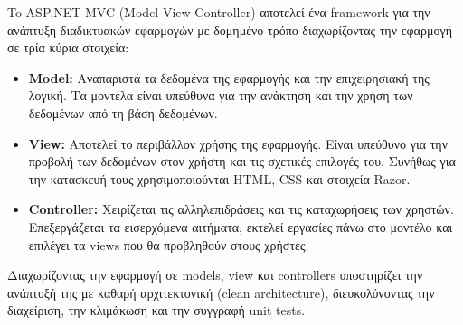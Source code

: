 To ASP.NET MVC (Model-View-Controller) αποτελεί ένα framework για την ανάπτυξη διαδικτυακών εφαρμογών
με δομημένο τρόπο διαχωρίζοντας την εφαρμογή σε τρία κύρια στοιχεία:
\begin{itemize}
    \item \textbf{Model:} Αναπαριστά τα δεδομένα της εφαρμογής και την επιχειρησιακή της λογική. Τα μοντέλα
            είναι υπεύθυνα για την ανάκτηση και την χρήση των δεδομένων από τη βάση δεδομένων.
     \item  \textbf{View:} Αποτελεί το περιβάλλον χρήσης της εφαρμογής. Είναι υπεύθυνο για την προβολή
            των δεδομένων στον χρήστη και τις σχετικές επιλογές του. Συνήθως για την κατασκευή τους
            χρησιμοποιούνται HTML, CSS και στοιχεία Razor.
    \item  \textbf{Controller:} Χειρίζεται τις αλληλεπιδράσεις και τις καταχωρήσεις των χρηστών. 
            Επεξεργάζεται τα εισερχόμενα αιτήματα, εκτελεί εργασίες πάνω στο μοντέλο και επιλέγει
            τα views που θα προβληθούν στους χρήστες.
\end{itemize}

Διαχωρίζοντας την εφαρμογή σε models, view και controllers υποστηρίζει την ανάπτυξή της με καθαρή 
αρχιτεκτονική (clean architecture), διευκολύνοντας την διαχείριση, την κλιμάκωση και την συγγραφή
unit tests.